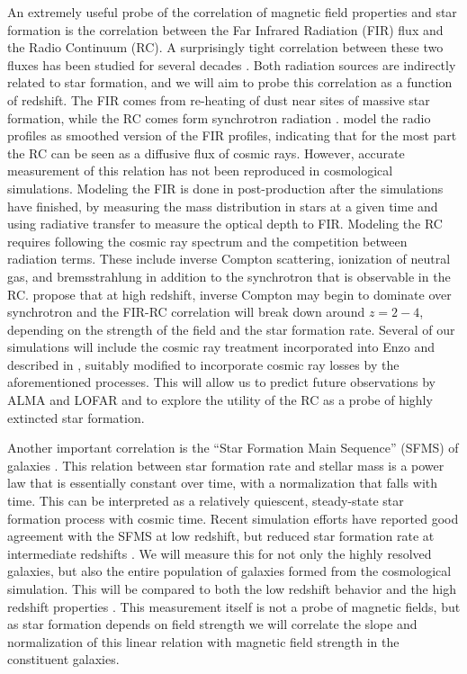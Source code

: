 An extremely useful probe of the correlation of magnetic field properties and
star formation is the
correlation between the Far Infrared Radiation (FIR) flux and the
Radio Continuum (RC).  A surprisingly tight correlation between these
two fluxes has been studied for several decades \citep{Helou85}.  Both
radiation sources are indirectly related to star formation, and we
will aim to probe this correlation as a function of redshift.  The FIR
comes from re-heating of dust near sites of massive star formation,
while the RC comes form synchrotron radiation
\citep{Helou93,Niklas97}.  \cite{Murphy06} model the radio profiles
as smoothed version of the FIR profiles, indicating that for the most
part the RC can be seen as a diffusive flux of cosmic rays.  However,
accurate measurement of this relation has not been reproduced in
cosmological simulations.  Modeling the FIR is done in post-production
after the simulations have finished, by measuring the mass
distribution in stars at a given time and using radiative transfer to
measure the optical depth to FIR.  Modeling the RC requires following
the cosmic ray spectrum and the competition between radiation terms.
These include inverse Compton scattering, ionization of neutral gas,
and bremsstrahlung in addition to the synchrotron that is observable in the RC.  \cite{Schleicher13b} propose that at high
redshift, inverse Compton may begin to dominate over synchrotron and the FIR-RC
correlation will break down around $z= 2-4$, depending on the strength
of the field and the star formation rate.  Several of our simulations
will include the cosmic ray treatment incorporated into Enzo and
described in \cite{Salem14,Salem14b}, suitably modified to incorporate
cosmic ray losses by the aforementioned processes.  This will allow us
to predict future observations by ALMA and LOFAR and to explore the
utility of the RC as a probe of highly extincted star formation.

Another important correlation is the ``Star Formation Main Sequence''
(SFMS) of galaxies \cite{Daddi07, Speagle14}. This relation
between star formation rate and stellar mass is a power law that is
essentially constant over time, with a normalization that falls with
time.  This can be interpreted as a relatively quiescent, steady-state
star formation process with cosmic time.  Recent simulation efforts
have reported good agreement with the SFMS at low redshift, but
reduced star formation rate at intermediate redshifts
\citep{Sparre15}.  We will measure this for not only the highly
resolved galaxies, but also the entire population of galaxies formed
from the cosmological simulation.  This will be compared to both the
low redshift behavior \cite{Brinchmann04} and the high redshift
properties \cite{Daddi07}.  This measurement itself is not a probe of magnetic
fields, but as star formation depends on field strength we will
correlate the slope and normalization of this linear relation with
magnetic field strength in the constituent galaxies.
